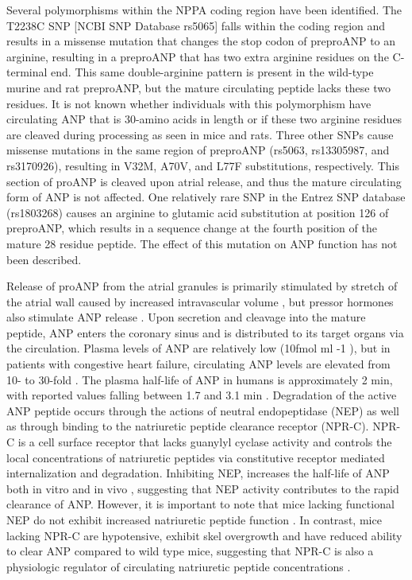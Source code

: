 \documentclass[14pt,a4paper,onecolumn]{article}
\begin{document}
Several polymorphisms within the NPPA coding region have been identified. The T2238C SNP [NCBI SNP Database rs5065] falls within the coding region and results in a missense mutation that changes the stop codon of preproANP to an arginine, resulting in a preproANP that has two extra arginine residues on the C-terminal end. This same double-arginine pattern is present in the wild-type murine and rat preproANP, but the mature circulating peptide lacks these two residues. It is not known whether individuals with this polymorphism have circulating ANP that is 30-amino acids in length or if these two arginine residues are cleaved during processing as seen in mice and rats. Three other SNPs cause missense mutations in the same region of preproANP (rs5063, rs13305987, and rs3170926), resulting in V32M, A70V, and L77F substitutions, respectively. This section of proANP is cleaved upon atrial release, and thus the mature circulating form of ANP is not affected. One relatively rare SNP in the Entrez SNP database (rs1803268) causes an arginine to glutamic acid substitution at position 126 of preproANP, which results in a sequence change at the fourth position of the mature 28 residue peptide. The effect of this mutation on ANP function has not been described.

Release of proANP from the atrial granules is primarily stimulated by stretch of the atrial wall caused by increased intravascular volume \citep{Bilder1986} \citep{Edwards1988} \citep{Lang1985}, but pressor hormones also stimulate ANP release \citep{Ruskoaho2003}.
Upon secretion and cleavage into the mature peptide, ANP enters the coronary sinus and is distributed to its target organs via the circulation. Plasma levels of ANP are relatively low (10fmol ml -1 ), but in patients with congestive heart failure, circulating ANP levels are elevated from 10- to 30-fold \citep{Burnett1986} \citep{Cody1986}.
The plasma half-life of ANP in humans is approximately 2 min, with reported values falling between 1.7 and 3.1 min \citep{Nakao1986} \citep{Yandle1986}.
Degradation of the active ANP peptide occurs through the actions of neutral endopeptidase (NEP) \citep{Stephenson1987} \citep{Vanneste1988} as well as through binding to the natriuretic peptide clearance receptor (NPR-C).
NPR-C is a cell surface receptor that lacks guanylyl cyclase activity and controls the local concentrations of natriuretic peptides via constitutive receptor mediated internalization and degradation. Inhibiting NEP, increases the half-life of ANP both in vitro \citep{Stephenson1987} \citep{Yandle1989} and in vivo \citep{Yandle1989},
suggesting that NEP activity contributes to the rapid clearance of ANP. However, it is important to note that mice lacking functional NEP do not exhibit increased natriuretic peptide function \citep{Lu1995}.
In contrast, mice lacking NPR-C are hypotensive, exhibit skel overgrowth and have reduced ability to clear ANP compared to wild type mice, suggesting that NPR-C is also a physiologic regulator of circulating natriuretic peptide concentrations \citep{Matsukawa1999}.
\end{document}

